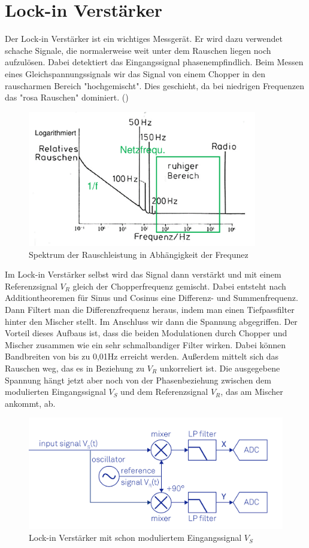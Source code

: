 
\section{Lock-in Verstärker}

Der Lock-in Verstärker ist ein wichtiges Messgerät. Er wird dazu verwendet schache Signale, die normalerweise weit unter dem Rauschen liegen noch aufzulösen.
Dabei detektiert das Eingangssignal phasenempfindlich. Beim Messen eines Gleichspannungssignals wir das Signal von einem Chopper in den rauscharmen Bereich "hochgemischt". 
Dies geschieht, da bei niedrigen Frequenzen das "rosa Rauschen" dominiert. (\cite{Herink2021}) 

\begin{figure}[h]
    \centering
    \includegraphics[width = 10cm ]{Bilder/Rauschen.png}
    \caption{Spektrum der Rauschleistung in Abhängigkeit der Frequnez \protect \footnotemark}
\end{figure}
Im Lock-in Verstärker selbst wird das Signal dann verstärkt und mit einem Referenzsignal $V_R$ gleich der Chopperfrequenz gemischt. Dabei entsteht nach Additiontheoremen für Sinus und Cosinus eine
Differenz- und Summenfrequenz. Dann Filtert man die Differenzfrequenz heraus, indem man einen Tiefpassfilter hinter den Mischer stellt. Im Anschluss wir dann die Spannung abgegriffen. 
Der Vorteil dieses Aufbaus ist, dass die beiden Modulationen durch Chopper und Mischer zusammen wie ein sehr schmalbandiger Filter wirken. Dabei können Bandbreiten von bis zu 0,01Hz erreicht werden. 
Außerdem mittelt sich das Rauschen weg, das es in Beziehung zu $V_R$ unkorreliert ist. Die ausgegebene Spannung hängt jetzt aber noch von der Phasenbeziehung zwischen dem 
modulierten Eingangssignal $V_S$ und dem Referenzsignal $V_R$, das am Mischer ankommt, ab.
\begin{figure}[ht]
    \centering
    \includegraphics[width = 12cm]{Bilder/Lockin.png}
    \caption{Lock-in Verstärker mit schon moduliertem Eingangssignal $V_S$ \protect \footnotemark}
    \label{lockin}
\end{figure}
